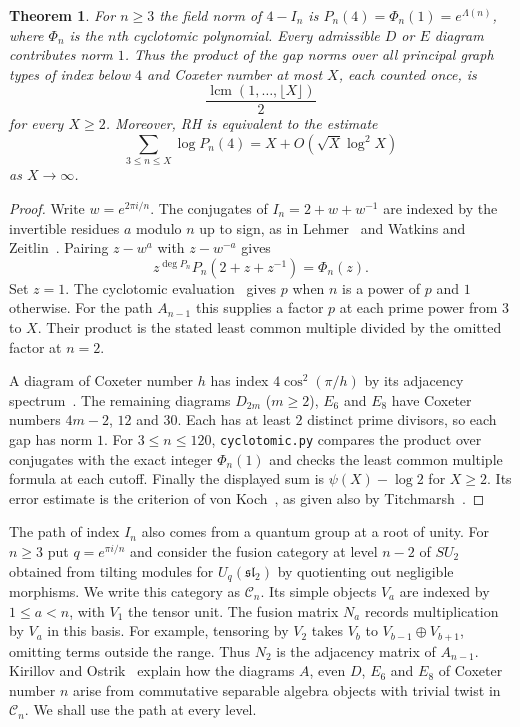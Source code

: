 \documentclass[11pt,a4paper]{article}
\newtheorem{thm}{Theorem}[section]
\begin{document}
\begin{thm}\label{indices}
For $n\geq3$ the field norm of $4-I_n$ is $P_n(4)=\Phi_n(1)=e^{\Lambda(n)}$, where $\Phi_n$ is the $n$th cyclotomic polynomial. Every admissible $D$ or $E$ diagram contributes norm $1$. Thus the product of the gap norms over all principal graph types of index below $4$ and Coxeter number at most $X$, each counted once, is
\[
 \frac{\operatorname{lcm}(1,\ldots,\lfloor X\rfloor)}{2}
\]
for every $X\geq2$. Moreover, RH is equivalent to the estimate
\[
 \sum_{3\leq n\leq X}\log P_n(4)=X+O(\sqrt X\log^2 X)
\]
as $X\to\infty$.
\end{thm}
\begin{proof}
Write $w=e^{2\pi i/n}$. The conjugates of $I_n=2+w+w^{-1}$ are indexed by the invertible residues $a$ modulo $n$ up to sign, as in Lehmer~\cite{lehmer} and Watkins and Zeitlin~\cite{wz}. Pairing $z-w^a$ with $z-w^{-a}$ gives
\[
 z^{\deg P_n}P_n(2+z+z^{-1})=\Phi_n(z).
\]
Set $z=1$. The cyclotomic evaluation~\cite{bhm} gives $p$ when $n$ is a power of $p$ and $1$ otherwise. For the path $A_{n-1}$ this supplies a factor $p$ at each prime power from $3$ to $X$. Their product is the stated least common multiple divided by the omitted factor at $n=2$.

A diagram of Coxeter number $h$ has index $4\cos^2(\pi/h)$ by its adjacency spectrum~\cite{ghj}. The remaining diagrams $D_{2m}$ ($m\geq2$), $E_6$ and $E_8$ have Coxeter numbers $4m-2$, $12$ and $30$. Each has at least $2$ distinct prime divisors, so each gap has norm $1$. For $3\leq n\leq120$, \texttt{cyclotomic.py} compares the product over conjugates with the exact integer $\Phi_n(1)$ and checks the least common multiple formula at each cutoff. Finally the displayed sum is $\psi(X)-\log2$ for $X\geq2$. Its error estimate is the criterion of von Koch~\cite{koch}, as given also by Titchmarsh~\cite{titchmarsh}.
\end{proof}

The path of index $I_n$ also comes from a quantum group at a root of unity. For $n\geq3$ put $q=e^{\pi i/n}$ and consider the fusion category at level $n-2$ of $SU_2$ obtained from tilting modules for $U_q(\mathfrak{sl}_2)$ by quotienting out negligible morphisms. We write this category as $\mathcal C_n$. Its simple objects $V_a$ are indexed by $1\leq a<n$, with $V_1$ the tensor unit. The fusion matrix $N_a$ records multiplication by $V_a$ in this basis. For example, tensoring by $V_2$ takes $V_b$ to $V_{b-1}\oplus V_{b+1}$, omitting terms outside the range. Thus $N_2$ is the adjacency matrix of $A_{n-1}$. Kirillov and Ostrik~\cite{ko} explain how the diagrams $A$, even $D$, $E_6$ and $E_8$ of Coxeter number $n$ arise from commutative separable algebra objects with trivial twist in $\mathcal C_n$. We shall use the path at every level.
\end{document}
